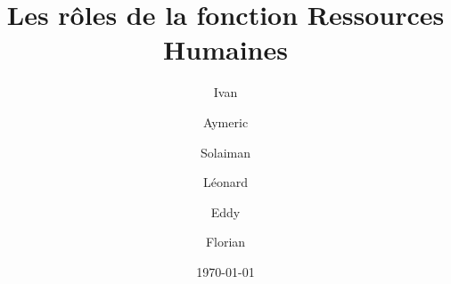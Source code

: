 \documentclass[a4paper, 12pt]{article}
\author{Ivan \bsc{Ahad} \and Aymeric \bsc{De Cocq} \and Solaiman \bsc{El Jilali} \and Léonard \bsc{Julémont} \and Eddy \bsc{Ndizera} \and Florian \bsc{Thuin}}
\title{Les rôles de la fonction Ressources Humaines}
\date{\today}
\begin{document}
\maketitle


\section{}
	\subsection{}
		\subsubsection{}
		
		\paragraph{}
			\subparagraph{}
\end{document}
